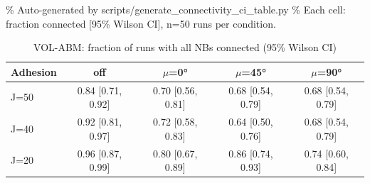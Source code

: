 \% Auto-generated by scripts/generate_connectivity_ci_table.py
\% Each cell: fraction connected [95\% Wilson CI], n=50 runs per condition.

\begin{table}[h]
\centering
\caption{VOL-ABM: fraction of runs with all NBs connected (95\% Wilson CI)}
\begin{tabular}{lcccc}
\toprule
Adhesion & off & $\mu$=0° & $\mu$=45° & $\mu$=90° \\
\midrule
J=50 & 0.84 [0.71, 0.92] & 0.70 [0.56, 0.81] & 0.68 [0.54, 0.79] & 0.68 [0.54, 0.79] \\
J=40 & 0.92 [0.81, 0.97] & 0.72 [0.58, 0.83] & 0.64 [0.50, 0.76] & 0.68 [0.54, 0.79] \\
J=20 & 0.96 [0.87, 0.99] & 0.80 [0.67, 0.89] & 0.86 [0.74, 0.93] & 0.74 [0.60, 0.84] \\
\bottomrule
\end{tabular}
\end{table}
